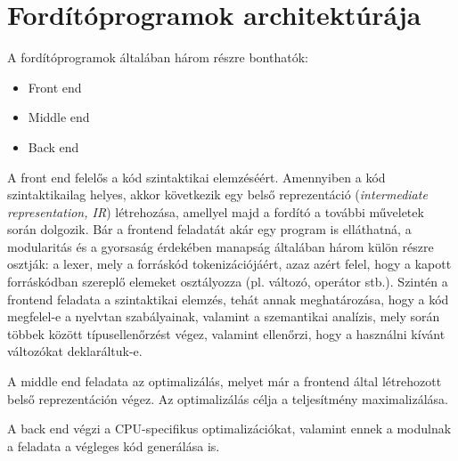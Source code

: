 \section{Fordítóprogramok architektúrája} \label{sect:compilerarch}
A fordítóprogramok általában három részre bonthatók:
\begin{itemize}
	\item Front end
	\item Middle end
	\item Back end
\end{itemize}
A front end felelős a kód szintaktikai elemzéséért. Amennyiben a kód szintaktikailag helyes, akkor következik egy belső reprezentáció (\textit{intermediate representation, IR}) létrehozása, amellyel majd a fordító a további műveletek során dolgozik. Bár a frontend feladatát akár egy program is elláthatná, a modularitás és a gyorsaság érdekében manapság általában három külön részre osztják: a lexer, mely a forráskód tokenizációjáért, azaz azért felel, hogy a kapott forráskódban szereplő elemeket osztályozza (pl. változó, operátor stb.). Szintén a frontend feladata a szintaktikai elemzés, tehát annak meghatározása, hogy a kód megfelel-e a nyelvtan szabályainak, valamint a szemantikai analízis, mely során többek között típusellenőrzést végez, valamint ellenőrzi, hogy a használni kívánt változókat deklaráltuk-e.


A middle end feladata az optimalizálás, melyet már a frontend által létrehozott belső reprezentáción végez. Az optimalizálás célja a teljesítmény maximalizálása.

A back end végzi a CPU-specifikus optimalizációkat, valamint ennek a modulnak a feladata a végleges kód generálása is.